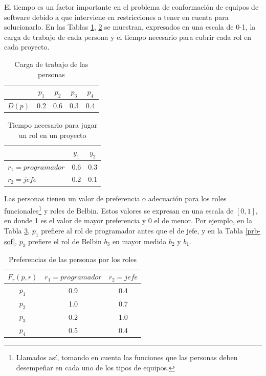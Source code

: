 El tiempo es un factor importante en el problema de conformación de equipos de software debido a que interviene en restricciones a tener en cuenta para solucionarlo. En las Tablas \ref{tp-sof}, \ref{tr-sof} se muestran, expresados en una escala de 0-1, la carga de trabajo de cada persona y el tiempo necesario para cubrir cada rol en cada proyecto. 


\begin{table}[H]
	\centering
	\caption{Carga de trabajo de las personas}\label{tp-sof}
	\begin{tabular}{|c|c|c|c|c|}
		\cline{2-5}
		\multicolumn{1}{c|}{} & $p_1$ & $p_2$ & $p_3$  & $p_4$ \\ \hline
		$D(p)$    & 0.2 & 0.6 & 0.3 & 0.4 \\ \hline
	\end{tabular}
\end{table}

\begin{table}[H]
  \centering
  \caption{Tiempo necesario para jugar un rol en un proyecto}\label{tr-sof}
\begin{tabular}{|l|c|c|}
	\hline
	\thead{$T(r,y)$}  & $y_1$ & $y_2$ \\ \hline
	$r_1=programador$ &  0.6  &  0.3  \\ \hline
	$r_2=jefe$        &  0.2  &  0.1  \\ \hline
\end{tabular}
\end{table}


Las personas tienen un valor de preferencia o adecuación para los roles funcionales\footnote{Llamados así, tomando en cuenta las funciones que las personas deben desempeñar en cada uno de los tipos de equipos.} y roles de Belbin. Estos valores se expresan en una escala de $[0, 1]$, en donde 1 es el valor de mayor preferencia y 0 el de menor. Por ejemplo, en la Tabla \ref{pr-sof}, $p_1$ prefiere al rol de programador antes que el de jefe, y en la Tabla \ref{prb-sof}, $p_3$ prefiere el rol de Belbin $b_3$ en mayor medida $b_2$ y $b_1$.

\begin{table}[H]
  \centering
  \caption{Preferencias de las personas por los roles}\label{pr-sof}
\begin{tabular}{|c|c|c|}
	\hline
	$F_r(p,r)$ & $r_1=programador$ & $r_2=jefe$ \\ \hline
	  $p_1$    &        0.9        &    0.4     \\ \hline
	  $p_2$    &        1.0        &    0.7     \\ \hline
	  $p_3$    &        0.2        &    1.0     \\ \hline
	  $p_4$    &        0.5        &    0.4     \\ \hline
\end{tabular}
\end{table}


